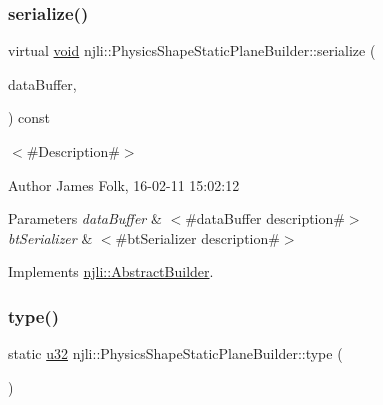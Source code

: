 \subsubsection{\texorpdfstring{serialize()}{serialize()}}
{\footnotesize\ttfamily virtual \mbox{\hyperlink{_thread_8h_af1e856da2e658414cb2456cb6f7ebc66}{void}} njli\+::\+Physics\+Shape\+Static\+Plane\+Builder\+::serialize (\begin{DoxyParamCaption}\item[{\mbox{\hyperlink{_thread_8h_af1e856da2e658414cb2456cb6f7ebc66}{void}} $\ast$}]{data\+Buffer,  }\item[{bt\+Serializer $\ast$}]{ }\end{DoxyParamCaption}) const\hspace{0.3cm}{\ttfamily [virtual]}}



$<$\#\+Description\#$>$ 

\begin{DoxyAuthor}{Author}
James Folk, 16-\/02-\/11 15\+:02\+:12
\end{DoxyAuthor}

\begin{DoxyParams}{Parameters}
{\em data\+Buffer} & $<$\#data\+Buffer description\#$>$ \\
\hline
{\em bt\+Serializer} & $<$\#bt\+Serializer description\#$>$ \\
\hline
\end{DoxyParams}


Implements \mbox{\hyperlink{classnjli_1_1_abstract_builder_ab66b774e02ccb9da554c9aab7fa6d981}{njli\+::\+Abstract\+Builder}}.

\mbox{\label{classnjli_1_1_physics_shape_static_plane_builder_afb58bbdb11a4a8435aee1d2b03ee63e5}} 
\subsubsection{\texorpdfstring{type()}{type()}}
{\footnotesize\ttfamily static \mbox{\hyperlink{_util_8h_a10e94b422ef0c20dcdec20d31a1f5049}{u32}} njli\+::\+Physics\+Shape\+Static\+Plane\+Builder\+::type (\begin{DoxyParamCaption}{ }\end{DoxyParamCaption})\hspace{0.3cm}{\ttfamily [static]}}

